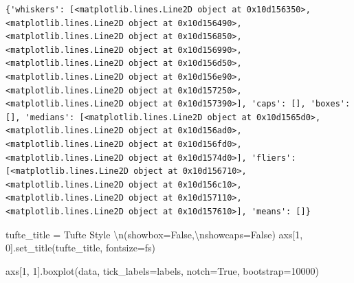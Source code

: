 \documentclass[
  letterpaper,
  DIV=11,
  numbers=noendperiod]{scrreprt}
\newenvironment{Shaded}{\begin{snugshade}}{\end{snugshade}}
\newcommand{\CharTok}[1]{\textcolor[rgb]{0.13,0.47,0.30}{#1}}
\newcommand{\DecValTok}[1]{\textcolor[rgb]{0.68,0.00,0.00}{#1}}
\newcommand{\NormalTok}[1]{\textcolor[rgb]{0.00,0.23,0.31}{#1}}
\newcommand{\OperatorTok}[1]{\textcolor[rgb]{0.37,0.37,0.37}{#1}}
\newcommand{\StringTok}[1]{\textcolor[rgb]{0.13,0.47,0.30}{#1}}
\newcommand{\VariableTok}[1]{\textcolor[rgb]{0.07,0.07,0.07}{#1}}
\begin{document}
\begin{verbatim}
{'whiskers': [<matplotlib.lines.Line2D object at 0x10d156350>, <matplotlib.lines.Line2D object at 0x10d156490>, <matplotlib.lines.Line2D object at 0x10d156850>, <matplotlib.lines.Line2D object at 0x10d156990>, <matplotlib.lines.Line2D object at 0x10d156d50>, <matplotlib.lines.Line2D object at 0x10d156e90>, <matplotlib.lines.Line2D object at 0x10d157250>, <matplotlib.lines.Line2D object at 0x10d157390>], 'caps': [], 'boxes': [], 'medians': [<matplotlib.lines.Line2D object at 0x10d1565d0>, <matplotlib.lines.Line2D object at 0x10d156ad0>, <matplotlib.lines.Line2D object at 0x10d156fd0>, <matplotlib.lines.Line2D object at 0x10d1574d0>], 'fliers': [<matplotlib.lines.Line2D object at 0x10d156710>, <matplotlib.lines.Line2D object at 0x10d156c10>, <matplotlib.lines.Line2D object at 0x10d157110>, <matplotlib.lines.Line2D object at 0x10d157610>], 'means': []}
\end{verbatim}

\begin{Shaded}
\begin{Highlighting}[]
\NormalTok{tufte\_title }\OperatorTok{=} \StringTok{\textquotesingle{}Tufte Style }\CharTok{\textbackslash{}n}\StringTok{(showbox=False,}\CharTok{\textbackslash{}n}\StringTok{showcaps=False)\textquotesingle{}}
\NormalTok{axs[}\DecValTok{1}\NormalTok{, }\DecValTok{0}\NormalTok{].set\_title(tufte\_title, fontsize}\OperatorTok{=}\NormalTok{fs)}

\NormalTok{axs[}\DecValTok{1}\NormalTok{, }\DecValTok{1}\NormalTok{].boxplot(data, tick\_labels}\OperatorTok{=}\NormalTok{labels, notch}\OperatorTok{=}\VariableTok{True}\NormalTok{, bootstrap}\OperatorTok{=}\DecValTok{10000}\NormalTok{)}
\end{Highlighting}
\end{Shaded}
\end{document}
